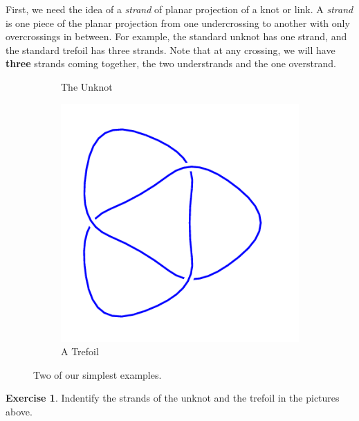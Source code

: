 \documentclass[12pt,letterpaper]{article}
\theoremstyle{definition}
\newtheorem{exercise}[question]{Exercise}
\begin{document}
First, we need the idea of a \emph{strand} of planar projection of a knot or link.
A \emph{strand} is one piece of the planar projection from one undercrossing to another with only overcrossings in between.
For example, the standard unknot has one strand, and the standard trefoil has three strands.
Note that at any crossing, we will have \textbf{three} strands coming together, the two understrands and the one overstrand.

\begin{figure}[h!]
    \centering
    \begin{subfigure}{.3\textwidth}
        \caption{The Unknot}
    \end{subfigure}
    \hspace{1cm}
    \begin{subfigure}{.3\textwidth}
        \includegraphics[width=\textwidth]{knotpics/3_1mirror.png}
        \caption{A Trefoil}
    \end{subfigure}
    \caption{Two of our simplest examples.}
\end{figure}

\begin{exercise}
Indentify the strands of the unknot and the trefoil in the pictures above.
\end{exercise}
\end{document}
